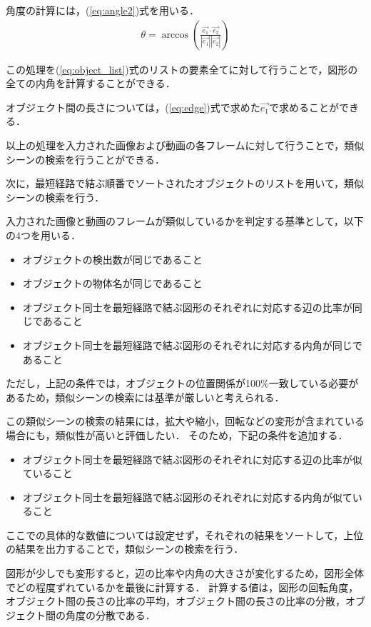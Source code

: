 \documentclass[a4j,12pt,dvipdfmx]{jreport}
\begin{document}
角度の計算には，(\ref{eq:angle2})式を用いる．
\begin{eqnarray}
  \label{eq:angle2}
  \theta = \arccos \left( \frac{\vec{e_1} \cdot \vec{e_2}}{|\vec{e_1}| |\vec{e_2}|} \right)
\end{eqnarray}

この処理を(\ref{eq:object_list})式のリストの要素全てに対して行うことで，図形の全ての内角を計算することができる．

オブジェクト間の長さについては，(\ref{eq:edge})式で求めた$\vec{e_1}$で求めることができる．


以上の処理を入力された画像および動画の各フレームに対して行うことで，類似シーンの検索を行うことができる．


次に，最短経路で結ぶ順番でソートされたオブジェクトのリストを用いて，類似シーンの検索を行う．

入力された画像と動画のフレームが類似しているかを判定する基準として，以下の4つを用いる．
\begin{itemize}
  \item オブジェクトの検出数が同じであること
  \item オブジェクトの物体名が同じであること
  \item オブジェクト同士を最短経路で結ぶ図形のそれぞれに対応する辺の比率が同じであること
  \item オブジェクト同士を最短経路で結ぶ図形のそれぞれに対応する内角が同じであること
\end{itemize}

ただし，上記の条件では，オブジェクトの位置関係が100\%一致している必要があるため，類似シーンの検索には基準が厳しいと考えられる．

この類似シーンの検索の結果には，拡大や縮小，回転などの変形が含まれている場合にも，類似性が高いと評価したい．
そのため，下記の条件を追加する．
\begin{itemize}
  \item オブジェクト同士を最短経路で結ぶ図形のそれぞれに対応する辺の比率が似ていること
  \item オブジェクト同士を最短経路で結ぶ図形のそれぞれに対応する内角が似ていること
\end{itemize}
ここでの具体的な数値については設定せず，それぞれの結果をソートして，上位の結果を出力することで，類似シーンの検索を行う．

図形が少しでも変形すると，辺の比率や内角の大きさが変化するため，図形全体でどの程度ずれているかを最後に計算する．
計算する値は，図形の回転角度，オブジェクト間の長さの比率の平均，オブジェクト間の長さの比率の分散，オブジェクト間の角度の分散である．
\end{document}
